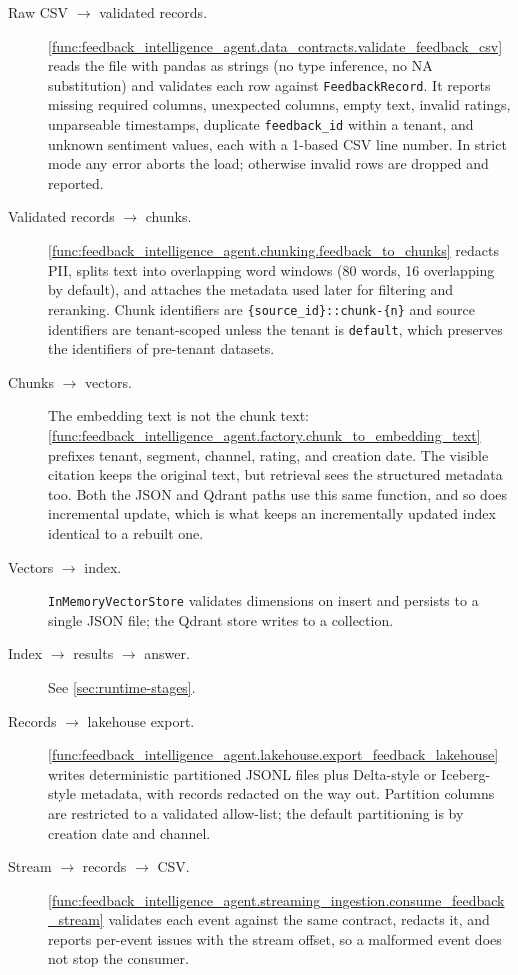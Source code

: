 \begin{description}
  \item[Raw CSV $\rightarrow$ validated records.]
    \cref{func:feedback_intelligence_agent.data_contracts.validate_feedback_csv}
    reads the file with pandas as strings (no type inference, no NA
    substitution) and validates each row against \texttt{FeedbackRecord}. It
    reports missing required columns, unexpected columns, empty text, invalid
    ratings, unparseable timestamps, duplicate \texttt{feedback\_id} within a
    tenant, and unknown sentiment values, each with a 1-based CSV line number.
    In strict mode any error aborts the load; otherwise invalid rows are
    dropped and reported.
  \item[Validated records $\rightarrow$ chunks.]
    \cref{func:feedback_intelligence_agent.chunking.feedback_to_chunks} redacts
    PII, splits text into overlapping word windows (80 words, 16 overlapping by
    default), and attaches the metadata used later for filtering and reranking.
    Chunk identifiers are \texttt{\{source\_id\}::chunk-\{n\}} and source
    identifiers are tenant-scoped unless the tenant is \texttt{default}, which
    preserves the identifiers of pre-tenant datasets.
  \item[Chunks $\rightarrow$ vectors.] The embedding text is not the chunk text:
    \cref{func:feedback_intelligence_agent.factory.chunk_to_embedding_text}
    prefixes tenant, segment, channel, rating, and creation date. The visible
    citation keeps the original text, but retrieval sees the structured
    metadata too. Both the JSON and Qdrant paths use this same function, and so
    does incremental update, which is what keeps an incrementally updated index
    identical to a rebuilt one.
  \item[Vectors $\rightarrow$ index.] \texttt{InMemoryVectorStore} validates
    dimensions on insert and persists to a single JSON file; the Qdrant store
    writes to a collection.
  \item[Index $\rightarrow$ results $\rightarrow$ answer.] See
    \cref{sec:runtime-stages}.
  \item[Records $\rightarrow$ lakehouse export.]
    \cref{func:feedback_intelligence_agent.lakehouse.export_feedback_lakehouse}
    writes deterministic partitioned JSONL files plus Delta-style or
    Iceberg-style metadata, with records redacted on the way out. Partition
    columns are restricted to a validated allow-list; the default partitioning
    is by creation date and channel.
  \item[Stream $\rightarrow$ records $\rightarrow$ CSV.]
    \cref{func:feedback_intelligence_agent.streaming_ingestion.consume_feedback_stream}
    validates each event against the same contract, redacts it, and reports
    per-event issues with the stream offset, so a malformed event does not stop
    the consumer.
\end{description}

